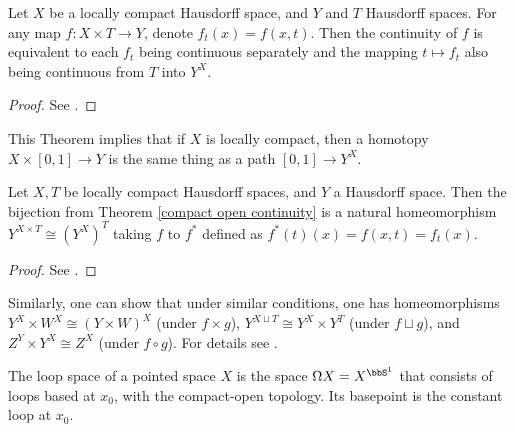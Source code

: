 \begin{thm}\label{compact open continuity}
    Let $X$ be a locally compact Hausdorff space, and $Y$ and $T$ Hausdorff spaces. For any map $f:X\times T\to Y$, denote $f_t(x)=f(x,t)$. Then the continuity of $f$ is equivalent to each $f_t$ being continuous separately and the mapping $t\mapsto f_t$ also being continuous from $T$ into $Y^X$. 
\end{thm}
\begin{proof}
    See \cite[Theorem VII.2.4]{Bredon}.
\end{proof}
This Theorem implies that if $X$ is locally compact, then a homotopy $X\times [0,1]\to Y$ is the same thing as a path $[0,1]\to Y^X$.
\begin{cor}
    Let $X,T$ be locally compact Hausdorff spaces, and $Y$ a Hausdorff space. Then the bijection from Theorem \ref{compact open continuity} is a natural homeomorphism $Y^{X\times T}\cong \left(Y^X\right)^T$ taking $f$ to $f^\ast$ defined as $f^\ast (t)(x)=f(x,t)=f_t(x)$.
\end{cor}
\begin{proof}
    See \cite[Theorem VII.2.5]{Bredon}.
\end{proof}
Similarly, one can show that under similar conditions, one has homeomorphisms $Y^X\times W^X\cong (Y\times W)^X$ (under $f\times g$), $Y^{X\sqcup T}\cong Y^X\times Y^T$ (under $f\sqcup g$), and $Z^Y\times Y^X \cong Z^X$ (under $f\circ g$). For details see \cite[\S VII.2]{Bredon}.
\begin{defn}
    The loop space of a pointed space $X$ is the space $\Omega X=X^{\bbS^1}$ that consists of loops based at $x_0$, with the compact-open topology. Its basepoint is the constant loop at $x_0$.
\end{defn}


